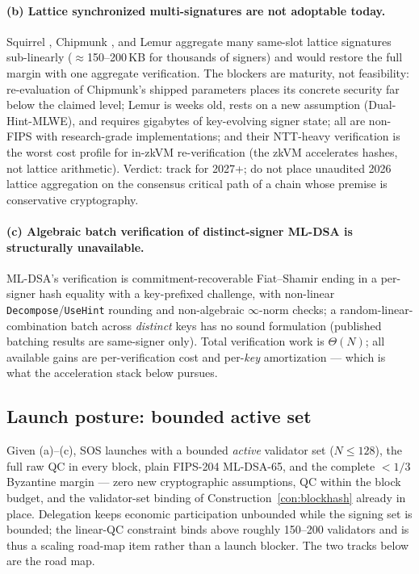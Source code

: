 \documentclass[11pt]{article}
\newcommand{\code}[1]{\texttt{#1}}
\newcommand{\mldsa}{ML\mbox{-}DSA\mbox{-}65}
\theoremstyle{plain}
\theoremstyle{definition}
\theoremstyle{remark}
\begin{document}
\paragraph{(b) Lattice synchronized multi-signatures are not adoptable
today.} Squirrel \cite{squirrel2022}, Chipmunk \cite{chipmunk2023}, and
Lemur \cite{lemur2026} aggregate many same-slot lattice signatures
sub-linearly ($\approx$150--200\,KB for thousands of signers) and would
restore the full margin with one aggregate verification. The blockers are
maturity, not feasibility: re-evaluation of Chipmunk's shipped parameters
places its concrete security far below the claimed level; Lemur is weeks
old, rests on a new assumption (Dual-Hint-MLWE), and requires gigabytes of
key-evolving signer state; all are non-FIPS with research-grade
implementations; and their NTT-heavy verification is the worst cost profile
for in-zkVM re-verification (the zkVM accelerates hashes, not lattice
arithmetic). Verdict: track for 2027+; do not place unaudited 2026 lattice
aggregation on the consensus critical path of a chain whose premise is
conservative cryptography.

\paragraph{(c) Algebraic batch verification of distinct-signer ML-DSA is
structurally unavailable.} ML-DSA's verification is
commitment-recoverable Fiat--Shamir ending in a per-signer hash equality
with a key-prefixed challenge, with non-linear \code{Decompose}/\code{UseHint}
rounding and non-algebraic $\infty$-norm checks; a random-linear-combination
batch across \emph{distinct} keys has no sound formulation (published
batching results are same-signer only). Total verification work is
$\Theta(N)$; all available gains are per-verification cost and per-\emph{key}
amortization --- which is what the acceleration stack below pursues.

\subsection{Launch posture: bounded active set}
\label{sec:bounded}

Given (a)--(c), SOS launches with a bounded \emph{active} validator set
($N \le 128$), the full raw QC in every block, plain FIPS-204 \mldsa{}, and
the complete $<\!1/3$ Byzantine margin --- zero new cryptographic
assumptions, QC within the block budget, and the validator-set binding of
Construction~\ref{con:blockhash} already in place. Delegation keeps economic
participation unbounded while the signing set is bounded; the linear-QC
constraint binds above roughly 150--200 validators and is thus a scaling
road-map item rather than a launch blocker. The two tracks below are the
road map.
\end{document}
